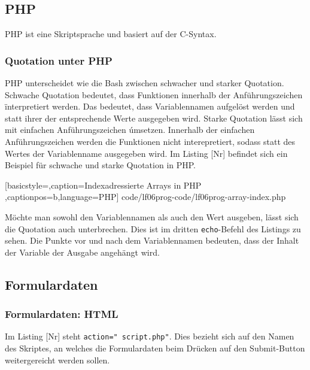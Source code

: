\subsection{PHP}

PHP ist eine Skriptsprache und basiert auf der C-Syntax.

\subsubsection{Quotation unter PHP}

PHP unterscheidet wie die Bash zwischen schwacher und starker Quotation. Schwache Quotation bedeutet, dass Funktionen innerhalb der Anführungszeichen \" interpretiert werden. Das bedeutet, dass Variablennamen aufgelöst werden und statt ihrer der entsprechende Werte ausgegeben wird. Starke Quotation lässt sich mit einfachen Anführungszeichen \' umsetzen. Innerhalb der einfachen Anführungszeichen werden die Funktionen nicht interepretiert, sodass statt des Wertes der Variablenname ausgegeben wird. Im Listing [Nr] befindet sich ein Beispiel für schwache und starke Quotation in PHP.


	[basicstyle=\small,caption={Indexadressierte Arrays in PHP}
	\label{lst:quotation},captionpos=b,language=PHP]
	{code/lf06prog-code/lf06prog-array-index.php}
	
Möchte man sowohl den Variablennamen als auch den Wert ausgeben, lässt sich die Quotation auch unterbrechen. Dies ist im dritten \texttt{echo}-Befehl des Listings zu sehen. Die Punkte vor und nach dem Variablennamen bedeuten, dass der Inhalt der Variable der Ausgabe angehängt wird.


\subsection{Formulardaten}

\subsubsection{Formulardaten: HTML}

Im Listing [Nr] steht \texttt{action="\ script.php"}. Dies bezieht sich auf den Namen des Skriptes, an welches die Formulardaten beim Drücken auf den Submit-Button weitergereicht werden sollen.

